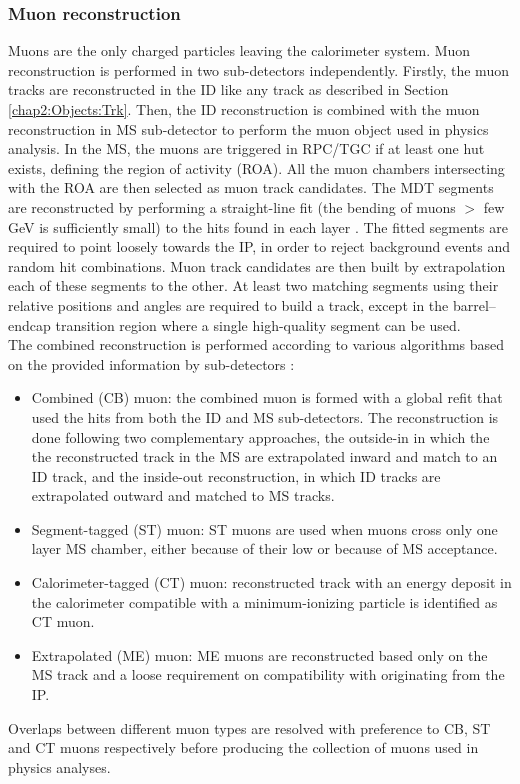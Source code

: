 \subsubsection{Muon reconstruction}
\label{chap2:Objects:Muon:Reco}
Muons are the only charged particles leaving the calorimeter system. Muon reconstruction is performed in two sub-detectors independently. Firstly, the muon tracks are reconstructed in the ID like any track as described in Section \ref{chap2:Objects:Trk}. Then, the ID reconstruction is combined with the muon reconstruction in MS sub-detector to perform the muon object used in physics analysis. In the MS, the muons are triggered in RPC/TGC if at least one hut exists, defining the region of activity (ROA). All the muon chambers intersecting with the ROA are then selected as muon track candidates. The MDT segments are reconstructed by performing a straight-line fit (the bending of muons $>$ few GeV is sufficiently small) to the hits found in each layer \cite{hough}. The fitted segments are required to point loosely towards the IP, in order to reject background events and random hit combinations. Muon track candidates are then built by extrapolation each of these segments to the other. At least two matching segments  using their relative positions and angles are required to build a track, except in the barrel–endcap transition region where a single high-quality segment can be used. \\
The combined reconstruction is performed according to various algorithms based on the provided information by sub-detectors \cite{Muon_Reco_2014_algo,Muon_Reco_2016_algo}: 
\begin{itemize}
    \item Combined (CB) muon: the combined muon is formed with a global refit that used the hits from both the ID and MS sub-detectors. The reconstruction is done following two complementary approaches, the outside-in in which the the reconstructed track in the MS are extrapolated inward and match to an ID track, and the inside-out reconstruction, in which ID tracks are extrapolated outward and matched to MS tracks. 
    \item Segment-tagged (ST) muon: ST muons are used when muons cross only one layer MS chamber, either because of their low \pT or because of MS acceptance. 
    \item Calorimeter-tagged (CT) muon: reconstructed track with an energy deposit in the calorimeter compatible with a minimum-ionizing particle is identified as CT muon. 
    \item Extrapolated (ME) muon: ME muons are reconstructed based only on the MS track and a loose requirement on compatibility with originating from the IP. 
\end{itemize}
Overlaps between different muon types are resolved with preference to CB, ST and CT muons respectively before producing the collection of muons used in physics analyses.

